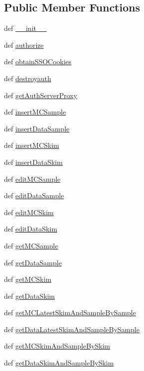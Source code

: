 \subsection*{Public Member Functions}
\begin{DoxyCompactItemize}
\item 
def \hyperlink{classaix3adb_1_1aix3adb_a8a9f87c54979d0dac6e434825cc32df9}{\-\_\-\-\_\-init\-\_\-\-\_\-}
\item 
def \hyperlink{classaix3adb_1_1aix3adb_a78b79f4bb2138afce2ccef65adac358f}{authorize}
\item 
def \hyperlink{classaix3adb_1_1aix3adb_a5d93931fe3e11b53feb9b12df833571b}{obtain\-S\-S\-O\-Cookies}
\item 
def \hyperlink{classaix3adb_1_1aix3adb_aae76dad69f16fff491ae611a49ca1231}{destroyauth}
\item 
def \hyperlink{classaix3adb_1_1aix3adb_a0613801eeb9a5fab015c4caed6930c89}{get\-Auth\-Server\-Proxy}
\item 
def \hyperlink{classaix3adb_1_1aix3adb_a335e5de44e8ccf14c43d4481e4144849}{insert\-M\-C\-Sample}
\item 
def \hyperlink{classaix3adb_1_1aix3adb_a8d28c54218a849b02d5a7984179fcccc}{insert\-Data\-Sample}
\item 
def \hyperlink{classaix3adb_1_1aix3adb_ab44b8530050a9bd8fedc66ce71480950}{insert\-M\-C\-Skim}
\item 
def \hyperlink{classaix3adb_1_1aix3adb_a1824ce4dcfec133e918e6ba39bdbf64e}{insert\-Data\-Skim}
\item 
def \hyperlink{classaix3adb_1_1aix3adb_a253ab495a681e492f84d679c58a96d20}{edit\-M\-C\-Sample}
\item 
def \hyperlink{classaix3adb_1_1aix3adb_a8f647f62d74927f96bb643f3017709b2}{edit\-Data\-Sample}
\item 
def \hyperlink{classaix3adb_1_1aix3adb_a5d7aa48120141cdd510045ebfd0800d1}{edit\-M\-C\-Skim}
\item 
def \hyperlink{classaix3adb_1_1aix3adb_af49b1bfadd0f576416a5b0b61cd2a8de}{edit\-Data\-Skim}
\item 
def \hyperlink{classaix3adb_1_1aix3adb_a100c375904f1060c782b3be8110a6224}{get\-M\-C\-Sample}
\item 
def \hyperlink{classaix3adb_1_1aix3adb_a536346c13734d319eff83ca3e330925a}{get\-Data\-Sample}
\item 
def \hyperlink{classaix3adb_1_1aix3adb_af1a427cb984a9562cb75f25c1699e0b1}{get\-M\-C\-Skim}
\item 
def \hyperlink{classaix3adb_1_1aix3adb_aaa87b71c5b72a6403048f2e194dad4d3}{get\-Data\-Skim}
\item 
def \hyperlink{classaix3adb_1_1aix3adb_a430a5866ec6cb933cf53273920024c0d}{get\-M\-C\-Latest\-Skim\-And\-Sample\-By\-Sample}
\item 
def \hyperlink{classaix3adb_1_1aix3adb_ae877a93055bc870c577267f51632fd02}{get\-Data\-Latest\-Skim\-And\-Sample\-By\-Sample}
\item 
def \hyperlink{classaix3adb_1_1aix3adb_a6b9031923890fe4f0f9ba7c616afaa73}{get\-M\-C\-Skim\-And\-Sample\-By\-Skim}
\item 
def \hyperlink{classaix3adb_1_1aix3adb_a7ed8479de73f73618c2168d7c61db160}{get\-Data\-Skim\-And\-Sample\-By\-Skim}
\end{DoxyCompactItemize}
